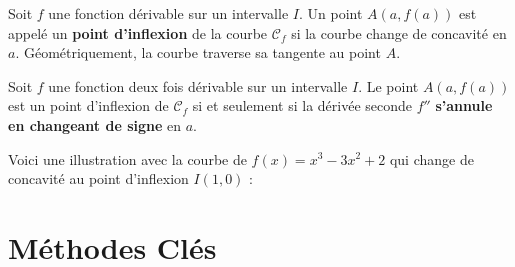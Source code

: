 \begin{definition}
Soit $f$ une fonction dérivable sur un intervalle $I$.
Un point $A(a, f(a))$ est appelé un \textbf{point d'inflexion} de la courbe $\mathcal{C}_f$ si la courbe change de concavité en $a$. Géométriquement, la courbe traverse sa tangente au point $A$.
\end{definition}

\begin{theoreme}
Soit $f$ une fonction deux fois dérivable sur un intervalle $I$.
Le point $A(a, f(a))$ est un point d'inflexion de $\mathcal{C}_f$ si et seulement si la dérivée seconde $f''$ \textbf{s'annule en changeant de signe} en $a$.
\end{theoreme}

Voici une illustration avec la courbe de $f(x) = x^3 - 3x^2 + 2$ qui change de concavité au point d'inflexion $I(1,0)$ :

\begin{center}
\end{center}

\section{Méthodes Clés}

